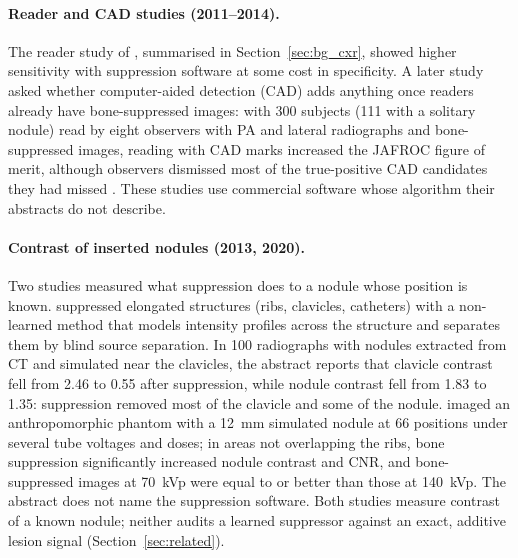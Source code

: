\paragraph{Reader and CAD studies (2011--2014).} The reader study of \citet{freedman2011lung}, summarised in Section~\ref{sec:bg_cxr}, showed
higher sensitivity with suppression software at some cost in specificity. A later study asked whether computer-aided detection (CAD) adds anything once readers
already have bone-suppressed images: with 300 subjects (111 with a solitary nodule) read by eight observers with PA and lateral radiographs and
bone-suppressed images, reading with CAD marks increased the JAFROC figure of merit, although observers dismissed most of the true-positive CAD
candidates they had missed \citep{schalekamp2014cad}. These studies use commercial software whose algorithm their abstracts do not describe.

\paragraph{Contrast of inserted nodules (2013, 2020).} Two studies measured what suppression does to a nodule whose position is known.
\citet{hogeweg2013suppression} suppressed elongated structures (ribs, clavicles, catheters) with a non-learned method that models intensity
profiles across the structure and separates them by blind source separation. In 100 radiographs with nodules extracted from CT and simulated near
the clavicles, the abstract reports that clavicle contrast fell from 2.46 to 0.55 after suppression, while nodule contrast fell from 1.83 to 1.35:
suppression removed most of the clavicle and some of the nodule. \citet{takagi2020dose} imaged an anthropomorphic phantom with a 12~mm simulated
nodule at 66 positions under several tube voltages and doses; in areas not overlapping the ribs, bone suppression significantly increased nodule
contrast and CNR, and bone-suppressed images at 70~kVp were equal to or better than those at 140~kVp. The abstract does not name the
suppression software. Both studies measure contrast of a known nodule; neither audits a learned suppressor against an exact, additive lesion
signal (Section~\ref{sec:related}).


